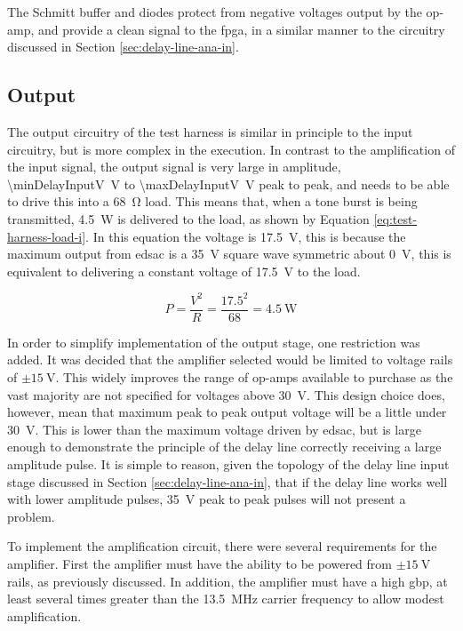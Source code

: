 The Schmitt buffer and diodes protect from negative voltages output by the op-amp, and provide a clean signal to the \gls{fpga}, in a similar manner to the circuitry discussed in Section \ref{sec:delay-line-ana-in}.

\subsection{Output}

The output circuitry of the test harness is similar in principle to the input circuitry, but is more complex in the execution. In contrast to the amplification of the input signal, the output signal is very large in amplitude, \SI{\minDelayInputV}{\volt} to \SI{\maxDelayInputV}{\volt} peak to peak, and needs to be able to drive this into a \SI{68}{\ohm} load. This means that, when a tone burst is being transmitted, \SI{4.5}{\watt} is delivered to the load, as shown by Equation \ref{eq:test-harness-load-i}. In this equation the voltage is \SI{17.5}{\volt}, this is because the maximum output from \gls{edsac} is a \SI{35}{\volt} square wave symmetric about \SI{0}{\volt}, this is equivalent to delivering a constant voltage of \SI{17.5}{\volt} to the load.

\begin{equation}
P = \frac{V^2}{R} = \frac{17.5^2}{68} = \SI{4.5}{\watt} \label{eq:test-harness-load-i}
\end{equation}

In order to simplify implementation of the output stage, one restriction was added. It was decided that the amplifier selected would be limited to voltage rails of $\pm \SI{15}{\volt}$. This widely improves the range of op-amps available to purchase as the vast majority are not specified for voltages above \SI{30}{\volt}. This design choice does, however, mean that maximum peak to peak output voltage will be a little under \SI{30}{\volt}. This is lower than the maximum voltage driven by \gls{edsac}, but is large enough to demonstrate the principle of the delay line correctly receiving a large amplitude pulse. It is simple to reason, given the topology of the delay line input stage discussed in Section \ref{sec:delay-line-ana-in}, that if the delay line works well with lower amplitude pulses, \SI{35}{\volt} peak to peak pulses will not present a problem.

To implement the amplification circuit, there were several requirements for the amplifier. First the amplifier must have the ability to be powered from  $\pm \SI{15}{\volt}$ rails, as previously discussed. In addition, the amplifier must have a high \gls{gbp}, at least several times greater than the \SI{13.5}{\mega\hertz} carrier frequency to allow modest amplification.

